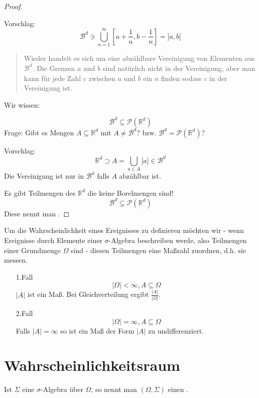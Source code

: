 \begin{proof}
\begin{itemize}
Vorschlag:
$$ \mathcal B^d \ni \bigcup_{n=1}^\infty [a+\frac{1}{n},b-\frac{1}{n}] = ]a,b[ $$
\begin{quote}
 Wieder handelt es sich um eine abzählbare Vereinigung von Elementen aus $\mathcal B^d$. Die Grenzen $a$ und $b$ sind natürlich nicht in der Vereinigung, aber man kann für jede Zahl $c$ zwischen $a$ und $b$ ein $n$ finden sodass $c$ in der Vereinigung ist.
\end{quote}
\end{itemize}

Wir wissen:

$$ \mathcal B ^d \subseteq \mathcal P (\mathbb R^d) $$
Frage:
Gibt es Mengen $A \subseteq \mathbb R^d$ mit $A \neq \mathcal B^d$? bzw. $ \mathcal B ^d = \mathcal P (\mathbb R^d) $?

Vorschlag:
$$ \mathbb R^d \supset A = \bigcup_{a\in A} \lbrack a \rbrack \in \mathcal B^d $$
Die Vereinigung ist nur in $\mathcal B^d$ falls $A$ abzählbar ist.

Es gibt Teilmengen des $\mathbb R^d$ die keine Borelmengen sind!
$$ \mathcal B ^d \subsetneq \mathcal P (\mathbb R^d) $$
Diese nennt man .
\end{proof}


Um die Wahrscheinlichkeit eines Ereignisses zu definieren möchten wir - wenn Ereignisse durch Elemente einer $\sigma$-Algebra beschreiben werde, also Teilmengen einer Grundmenge $\Omega$ sind - diesen Teilmengen eine Maßzahl zuordnen, d.h. sie messen.
\begin{itemize}
 \item[1.Fall]
$$ \lvert \Omega \rvert < \infty, A \subseteq \Omega$$
$\lvert A \rvert$ ist ein Maß. Bei Gleichverteilung ergibt $\frac{\lvert A \rvert}{\lvert \Omega \rvert}$.
 \item[2.Fall]
$$ \lvert \Omega \rvert = \infty, A \subseteq \Omega$$
Falls $\lvert A \rvert = \infty$ so ist ein Maß der Form $\lvert A \rvert$ zu undifferenziert.
\end{itemize}
\section{Wahrscheinlichkeitsraum}
Ist $\Sigma$ eine $\sigma$-Algebra über $\Omega$, so nennt man $(\Omega,\Sigma)$ einen .

